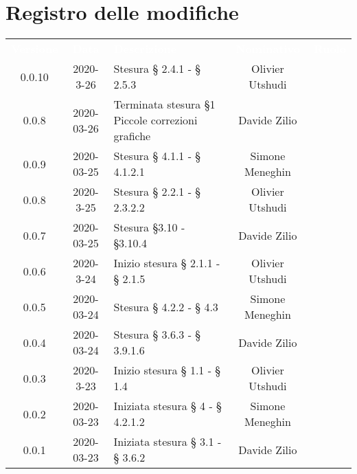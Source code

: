 \section*{Registro delle modifiche}
{
	\centering
	\begin{longtable}{ c c  C{4cm}  c  c }
		\textcolor{white}{\textbf{Versione}} & \textcolor{white}{\textbf{Data}} & \textcolor{white}{\textbf{Descrizione}} & \textcolor{white}{\textbf{Nominativo}} & \textcolor{white}{\textbf{Ruolo}}\\
		
		0.0.10 & 2020-3-26 & Stesura § 2.4.1 - § 2.5.3 & Olivier Utshudi &\reda{}\\
		0.0.8 & 2020-03-26 & Terminata stesura \S 1 \newline Piccole correzioni grafiche & Davide Zilio &\reda{}\\
		0.0.9 & 2020-03-25 & Stesura § 4.1.1 - § 4.1.2.1 & Simone Meneghin &\reda{}\\	
		
		0.0.8 & 2020-3-25 & Stesura § 2.2.1 - § 2.3.2.2 & Olivier Utshudi &\reda{}\\
		
		0.0.7 & 2020-03-25 & Stesura \S 3.10 - \S 3.10.4 & Davide Zilio & \reda{}\\
		
		0.0.6 & 2020-3-24 & Inizio stesura § 2.1.1 - § 2.1.5 & Olivier Utshudi &\reda{}\\

		0.0.5 & 2020-03-24 & Stesura § 4.2.2 - § 4.3 & Simone Meneghin &\reda{}\\		
		
		0.0.4 & 2020-03-24 & Stesura § 3.6.3 - § 3.9.1.6 & Davide Zilio &\reda{}\\
		
		0.0.3 & 2020-3-23 & Inizio stesura § 1.1 - § 1.4 & Olivier Utshudi &\reda{}\\
		
		0.0.2 & 2020-03-23 & Iniziata stesura § 4 - § 4.2.1.2 & Simone Meneghin &\reda{}\\
		
		0.0.1 & 2020-03-23 & Iniziata stesura § 3.1 - § 3.6.2 & Davide Zilio &\reda{}\\		
		
	\end{longtable}

}